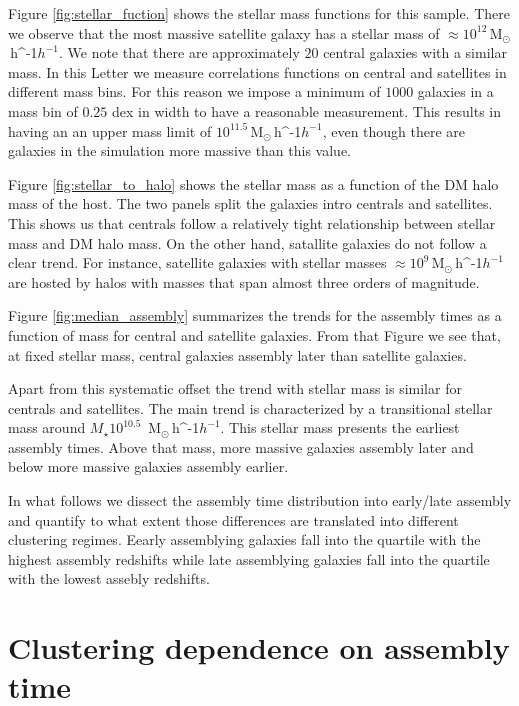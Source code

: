 \documentclass[fleqn,usenatbib]{mnras}
\newcommand{\Msunh}{\,{\rm M}$_{\odot}$\,\ifmmode h^{-1}\else $h^{-1}$\fi}
\begin{document}
Figure \ref{fig:stellar_fuction} shows the stellar mass functions for
this sample.
There we observe that the most massive satellite galaxy has a stellar
mass of $\approx 10^{12}$\Msunh.    
We note that there are approximately $20$ central galaxies
with a similar mass.
In this Letter we measure correlations functions on central and
satellites in different mass bins.
For this reason we impose a  minimum of $1000$ galaxies
in a mass bin of $0.25$ dex in width to have a reasonable
measurement. 
This results in having an an upper mass limit of
$10^{11.5}$\Msunh, even though there are galaxies in the simulation
more massive than this value.

Figure \ref{fig:stellar_to_halo} shows the stellar mass as a function
of the DM halo mass of the host.
The two panels split the galaxies intro centrals and satellites. 
This shows us that centrals follow a relatively tight relationship
between stellar mass and DM halo mass.
On the other hand, satallite galaxies do not follow a clear trend.
For instance, satellite galaxies with stellar masses $\approx
10^{9}$\Msunh are hosted by halos with masses that span almost three
orders of magnitude.

Figure \ref{fig:median_assembly} summarizes the trends for the
assembly times as a function of mass for central and satellite
galaxies.
From that Figure we see that, at fixed stellar mass, central galaxies
assembly later than  satellite galaxies.

Apart from this systematic offset the trend with stellar mass is
similar for centrals and satellites.
The main trend is characterized by a transitional stellar mass around 
$M_\star 10^{10.5}$ \Msunh.
This stellar mass presents the earliest assembly times.
Above that mass, more massive galaxies assembly later and below
more massive galaxies assembly earlier.


In what follows we dissect the assembly time distribution into
early/late assembly and quantify to what extent those differences are
translated into different clustering regimes.
Eearly assemblying galaxies fall into the quartile with the highest
assembly redshifts while late assemblying galaxies fall into the
quartile with the lowest assebly redshifts.


\section{Clustering dependence on assembly time}
\label{sec:results}
\end{document}
